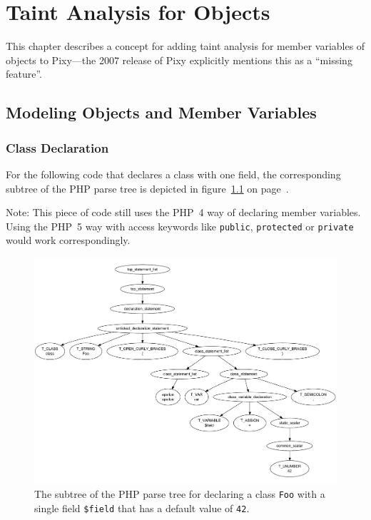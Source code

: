 \chapter{Taint Analysis for Objects}
\label{field-tainting}

This chapter describes a concept for adding taint analysis for member variables of objects to Pixy---the 2007 release of Pixy explicitly mentions this as a ``missing feature''.


\section{Modeling Objects and Member Variables}


\subsection{Class Declaration}

For the following code that declares a class with one field, the corresponding subtree of the PHP parse tree is depicted in figure~\ref{fig:parse-tree-foo-class} on page~\pageref{fig:parse-tree-foo-class}.


Note: This piece of code still uses the PHP~4 way of declaring member variables. Using the PHP~5 way with access keywords like \texttt{public}, \texttt{protected} or \texttt{private} would work correspondingly.

\begin{figure}[htb]
  \begin{center}
    \includegraphics[width=\linewidth, height=.9\textheight, keepaspectratio]{images/parsetree-foo-class-declaration}
    \caption{The subtree of the PHP parse tree for declaring a class \texttt{Foo} with a single field \texttt{\$field} that has a default value of \texttt{42}.}
    \label{fig:parse-tree-foo-class}
  \end{center}
\end{figure}

